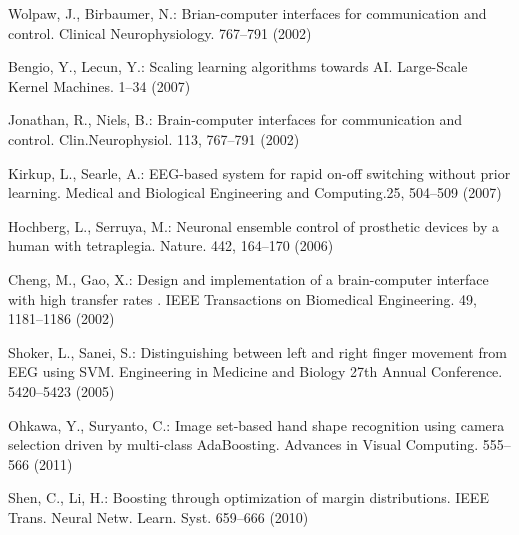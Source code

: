 \documentclass{llncs}
\begin{document}
\begin{thebibliography}{}
Wolpaw, J., Birbaumer, N.:
Brian-computer interfaces for communication and control.
Clinical Neurophysiology. 767--791 (2002)

Bengio, Y., Lecun, Y.:
Scaling learning algorithms towards AI.
Large-Scale Kernel Machines. 1--34 (2007)

Jonathan, R., Niels, B.:
Brain-computer interfaces for communication and control.
Clin.Neurophysiol. 113, 767--791 (2002)

Kirkup, L., Searle, A.:
EEG-based system for rapid on-off switching without prior learning.
Medical and Biological Engineering and Computing.25, 504--509 (2007)

Hochberg, L., Serruya, M.:
Neuronal ensemble control of prosthetic devices by a human with tetraplegia.
Nature. 442, 164--170 (2006)

Cheng, M., Gao, X.:
Design and implementation of a brain-computer interface with high transfer rates .
IEEE Transactions on Biomedical Engineering. 49, 1181--1186 (2002)

Shoker, L., Sanei, S.:
Distinguishing between left and right finger movement from EEG using SVM.
Engineering in Medicine and Biology 27th Annual Conference. 5420--5423 (2005)

Ohkawa, Y., Suryanto, C.:
Image set-based hand  shape  recognition  using  camera  selection  driven  by multi-class AdaBoosting.
Advances in Visual Computing. 555--566 (2011)

Shen, C., Li, H.:
Boosting through optimization of margin distributions.
 IEEE Trans. Neural Netw. Learn. Syst. 659--666 (2010)

\end{thebibliography}
\end{document}
